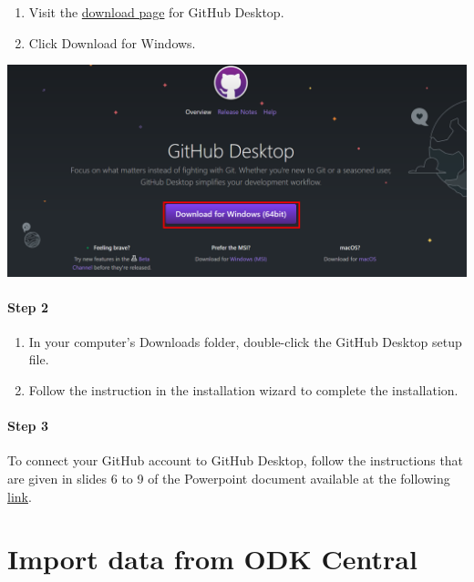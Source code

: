 \documentclass[
  letterpaper,
  DIV=11,
  numbers=noendperiod]{scrreprt}
\providecommand{\tightlist}{%
  \setlength{\itemsep}{0pt}\setlength{\parskip}{0pt}}\usepackage{longtable,booktabs,array}
\begin{document}
\begin{enumerate}
\def\labelenumi{\arabic{enumi}.}
\tightlist
\item
  Visit the \href{https://desktop.github.com/}{download page} for GitHub
  Desktop.
\item
  Click Download for Windows.
\end{enumerate}

\includegraphics{./images/paste-465BAC3C.png}

\hypertarget{step-2-5}{%
\subsubsection{Step 2}\label{step-2-5}}

\begin{enumerate}
\def\labelenumi{\arabic{enumi}.}
\tightlist
\item
  In your computer's Downloads folder, double-click the GitHub Desktop
  setup file.
\item
  Follow the instruction in the installation wizard to complete the
  installation.
\end{enumerate}

\hypertarget{step-3-4}{%
\subsubsection{Step 3}\label{step-3-4}}

To connect your GitHub account to GitHub Desktop, follow the
instructions that are given in slides 6 to 9 of the Powerpoint document
available at the following
\href{https://drive.switch.ch/index.php/s/1eFnksrX0UtjfZV}{link}.

\hypertarget{import-data-from-odk-central}{%
\chapter{Import data from ODK
Central}\label{import-data-from-odk-central}}
\end{document}

